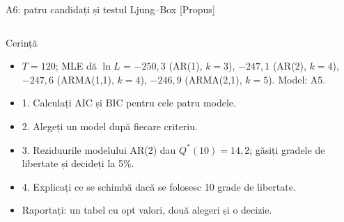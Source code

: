 \begin{frame}{A6: patru candidați și testul Ljung--Box [Propus]}
\propsub
\itemsize{\scriptsize}
\begin{columns}[T]
\begin{column}{\taskw}
\begin{block}{Cerință}
\begin{itemize}
    \item $T = 120$; MLE dă $\ln L$ = $-250{,}3$ (AR(1), $k = 3$), $-247{,}1$ (AR(2), $k = 4$), $-247{,}6$ (ARMA(1,1), $k = 4$), $-246{,}9$ (ARMA(2,1), $k = 5$). Model: A5.
    \item 1. Calculați AIC și BIC pentru cele patru modele.
    \item 2. Alegeți un model după fiecare criteriu.
    \item 3. Reziduurile modelului AR(2) dau $Q^*(10) = 14{,}2$; găsiți gradele de libertate și decideți la 5\%.
    \item 4. Explicați ce se schimbă dacă se folosesc 10 grade de libertate.
    \item Raportați: un tabel cu opt valori, două alegeri și o decizie.
\end{itemize}
\end{block}
\end{column}
\begin{column}{\solw}
\end{column}
\end{columns}
\end{frame}


